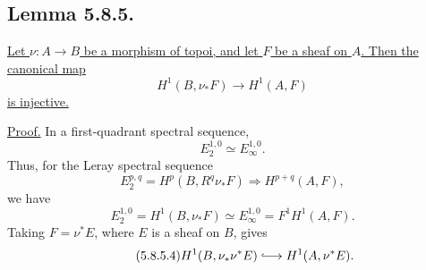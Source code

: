 \subsection*{Lemma 5.8.5.}
\underline{Let $\nu:A\to B$ be a morphism of topoi, and let $F$ be a
sheaf on $A$.  Then the canonical map}
\begin{equation}\tag{5.8.5.1}
H^1(B,\nu_*F)\longrightarrow H^1(A,F)
\end{equation}
\underline{is injective.}

\underline{Proof.}
In a first-quadrant spectral sequence,
\begin{equation}\tag{5.8.5.2}
E_2^{1,0}\simeq E_\infty^{1,0}.
\end{equation}
Thus, for the Leray spectral sequence
\[
E_2^{p,q}=H^p(B,R^q\nu_*F)
\Longrightarrow H^{p+q}(A,F),
\]
we have
\begin{equation}\tag{5.8.5.3}
E_2^{1,0}=H^1(B,\nu_*F)
\simeq E_\infty^{1,0}
=F^1H^1(A,F).
\end{equation}
Taking $F=\nu^*E$, where $E$ is a sheaf on $B$, gives
\begin{equation}\tag{5.8.5.4}
H^1(B,\nu_*\nu^*E)
\lhook\joinrel\longrightarrow
H^1(A,\nu^*E).
\end{equation}
